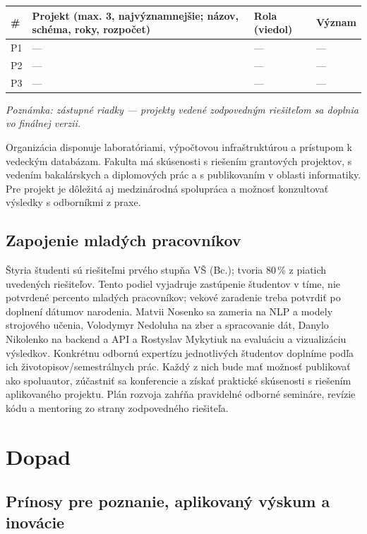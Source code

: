 \documentclass[11pt,a4paper]{article}
\begin{document}
\begin{table}[h!]
\centering
\small
\begin{tabularx}{\textwidth}{@{}p{0.8cm} X p{2.2cm} p{1.6cm}@{}}
\toprule
\# & Projekt (max. 3, najvýznamnejšie; názov, schéma, roky, rozpočet) & Rola (viedol) & Význam \\
\midrule
P1 & --- & --- & --- \\
P2 & --- & --- & --- \\
P3 & --- & --- & --- \\
\bottomrule
\end{tabularx}
\smallskip
\emph{Poznámka: zástupné riadky — projekty vedené zodpovedným riešiteľom sa doplnia vo finálnej verzii.}
\end{table}

Organizácia disponuje laboratóriami, výpočtovou infraštruktúrou a prístupom k vedeckým databázam. Fakulta má skúsenosti s riešením grantových projektov, s vedením bakalárskych a diplomových prác a s publikovaním v oblasti informatiky. Pre projekt je dôležitá aj medzinárodná spolupráca a možnosť konzultovať výsledky s odborníkmi z praxe.

\subsection{Zapojenie mladých pracovníkov}

Štyria študenti sú riešiteľmi prvého stupňa VŠ (Bc.); tvoria 80\,\% z piatich uvedených riešiteľov. Tento podiel vyjadruje zastúpenie študentov v tíme, nie potvrdené percento mladých pracovníkov; vekové zaradenie treba potvrdiť po doplnení dátumov narodenia. Matvii Nosenko sa zameria na NLP a modely strojového učenia, Volodymyr Nedoluha na zber a spracovanie dát, Danylo Nikolenko na backend a API a Rostyslav Mykytiuk na evaluáciu a vizualizáciu výsledkov. Konkrétnu odbornú expertízu jednotlivých študentov doplníme podľa ich životopisov/semestrálnych prác. Každý z nich bude mať možnosť publikovať ako spoluautor, zúčastniť sa konferencie a získať praktické skúsenosti s riešením aplikovaného projektu. Plán rozvoja zahŕňa pravidelné odborné semináre, revízie kódu a mentoring zo strany zodpovedného riešiteľa.

\section{Dopad}

\subsection{Prínosy pre poznanie, aplikovaný výskum a inovácie}
\end{document}
